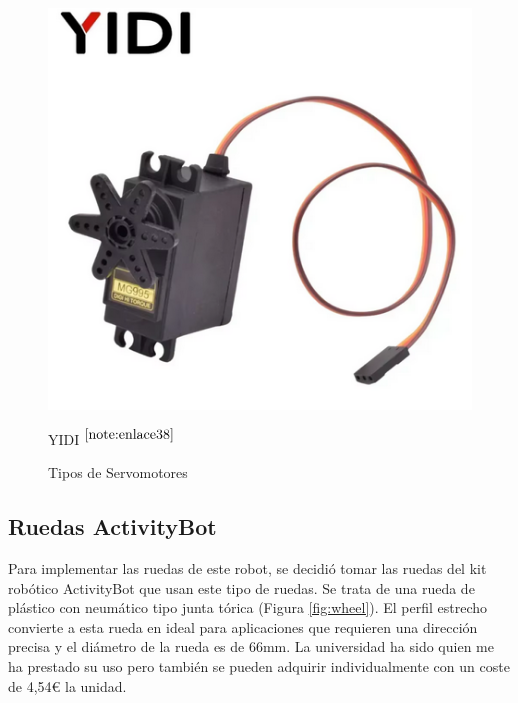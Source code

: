 \begin{figure}[ht!]
\begin{minipage}{0.33\linewidth}
		\includegraphics[width=\linewidth]{figs/diyi.png}
		\caption*{\centering YIDI $^{\ref{note:enlace38}}$} %
	\end{minipage}
	\caption{Tipos de Servomotores}
	\label{fig:parallax}
\end{figure}


\setcounter{footnote}{37} %

\setcounter{footnote}{38} %


\subsection{Ruedas ActivityBot}

Para implementar las ruedas de este robot, se decidió tomar las ruedas del kit robótico ActivityBot que usan este tipo de ruedas. Se trata de una rueda de plástico con neumático tipo junta tórica (Figura \ref{fig:wheel}). El perfil estrecho convierte a esta rueda en ideal para aplicaciones que requieren una dirección precisa y el diámetro de la rueda es de 66mm. La universidad ha sido quien me ha prestado su uso pero también se pueden adquirir individualmente con un coste de 4,54€ la unidad.

